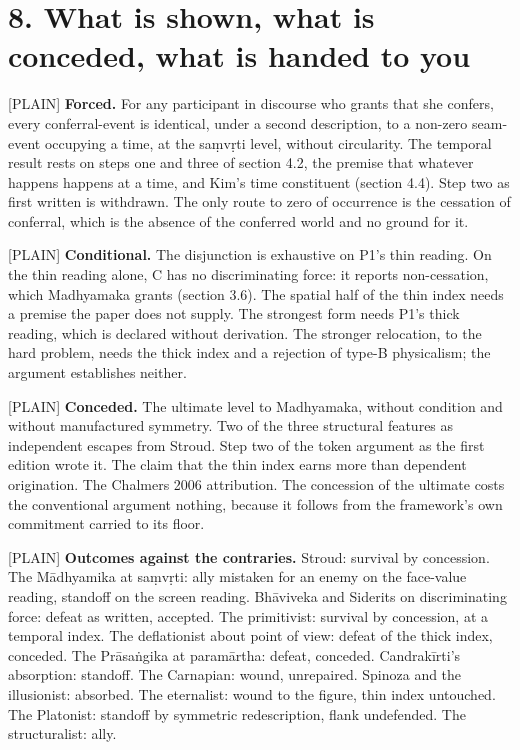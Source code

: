 \documentclass[11pt]{article}
\newcommand{\register}[1]{{\ttfamily\small #1}}
\begin{document}
\section*{8. What is shown, what is conceded, what is handed to you}

\register{[PLAIN]} \textbf{Forced.} For any participant in discourse who grants that she confers, every conferral-event is identical, under a second description, to a non-zero seam-event occupying a time, at the saṃvṛti level, without circularity. The temporal result rests on steps one and three of section 4.2, the premise that whatever happens happens at a time, and Kim's time constituent (section 4.4). Step two as first written is withdrawn. The only route to zero of occurrence is the cessation of conferral, which is the absence of the conferred world and no ground for it.

\register{[PLAIN]} \textbf{Conditional.} The disjunction is exhaustive on P1's thin reading. On the thin reading alone, C has no discriminating force: it reports non-cessation, which Madhyamaka grants (section 3.6). The spatial half of the thin index needs a premise the paper does not supply. The strongest form needs P1's thick reading, which is declared without derivation. The stronger relocation, to the hard problem, needs the thick index and a rejection of type-B physicalism; the argument establishes neither.

\register{[PLAIN]} \textbf{Conceded.} The ultimate level to Madhyamaka, without condition and without manufactured symmetry. Two of the three structural features as independent escapes from Stroud. Step two of the token argument as the first edition wrote it. The claim that the thin index earns more than dependent origination. The Chalmers 2006 attribution. The concession of the ultimate costs the conventional argument nothing, because it follows from the framework's own commitment carried to its floor.

\register{[PLAIN]} \textbf{Outcomes against the contraries.} Stroud: survival by concession. The Mādhyamika at saṃvṛti: ally mistaken for an enemy on the face-value reading, standoff on the screen reading. Bhāviveka and Siderits on discriminating force: defeat as written, accepted. The primitivist: survival by concession, at a temporal index. The deflationist about point of view: defeat of the thick index, conceded. The Prāsaṅgika at paramārtha: defeat, conceded. Candrakīrti's absorption: standoff. The Carnapian: wound, unrepaired. Spinoza and the illusionist: absorbed. The eternalist: wound to the figure, thin index untouched. The Platonist: standoff by symmetric redescription, flank undefended. The structuralist: ally.
\end{document}
